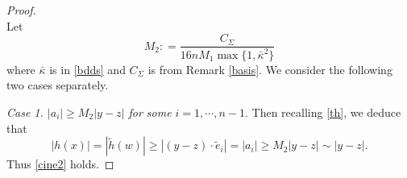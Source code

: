 \documentclass[11pt,a4paper,reqno]{amsart}
\newcommand{\1}{\mathbf{1}}
\numberwithin{equation}{section}
\theoremstyle{plain}
\theoremstyle{definition}
\theoremstyle{remark}
\begin{document}
\begin{proof}
\begin{equation}
\end{equation}
Let
$$  M_2 : = \frac{C_\Sigma}{16n M_1 \max\{1,\bar\kappa^2\}}$$
where $\bar\kappa$ is in \eqref{bdds} and $C_\Sigma$ is from Remark \ref{basis}.
We consider the following two cases separately.

\medskip
\emph{Case 1. $|a_i| \ge M_2|y-z|$ for some $i=1,\cdots, n-1$}. Then recalling \eqref{th},
we deduce that
$$ |h(x)| = |\tilde h (w)|  \ge   |(y-z) \cdot \tilde e_i| = |a_i| \ge M_2|y-z|  \sim |y-z|.$$
Thus \eqref{cine2} holds.


\end{proof}
\end{document}
